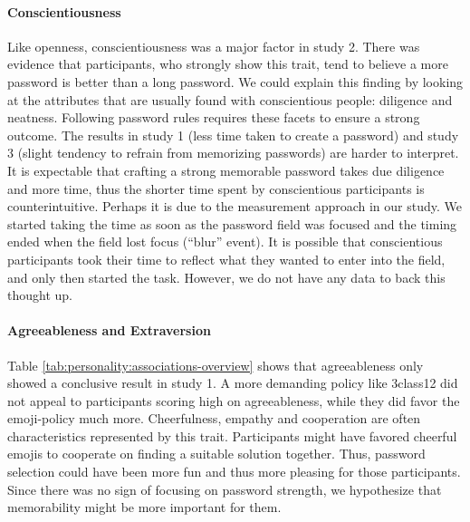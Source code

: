 \paragraph{Conscientiousness} Like openness, conscientiousness was a major factor in study 2. There was evidence that participants, who strongly show this trait, tend to believe a more password is better than a long password. We could explain this finding by looking at the attributes that are usually found with conscientious people: diligence and neatness. Following password rules requires these facets to ensure a strong outcome. The results in study 1 (less time taken to create a password) and study 3 (slight tendency to refrain from memorizing passwords) are harder to interpret. It is expectable that crafting a strong memorable password takes due diligence and more time, thus the shorter time spent by conscientious participants is counterintuitive. Perhaps it is due to the measurement approach in our study. We started taking the time as soon as the password field was focused and the timing ended when the field lost focus (``blur'' event). It is possible that conscientious participants took their time to reflect what they wanted to enter into the field, and only then started the task. However, we do not have any data to back this thought up.


\paragraph{Agreeableness and Extraversion} Table \ref{tab:personality:associations-overview} shows that agreeableness only showed a conclusive result in study 1. A more demanding policy like 3class12 did not appeal to participants scoring high on agreeableness, while they did favor the emoji-policy much more. Cheerfulness, empathy and cooperation are often characteristics represented by this trait. 
Participants might have favored cheerful emojis to cooperate on finding a suitable solution together. Thus, password selection could have been more fun and thus more pleasing for those participants. Since there was no sign of focusing on password strength, we hypothesize that memorability might be more important for them. 


